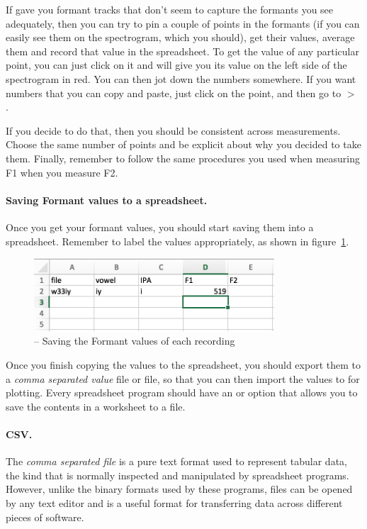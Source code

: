 If \Praat{} gave you formant tracks that don't seem to capture the formants you see adequately, then you can try to pin a couple of points in the formants (if you can easily see them on the spectrogram, which you should), get their values, average them and record that value in the spreadsheet. To get the value of any particular point, you can just click on it and \Praat{} will give you its value on the left side of the spectrogram in red. You can then jot down the numbers somewhere. If you want numbers that you can copy and paste, just click on the point, and then go to  $>$ .

If you decide to do that, then you should be consistent across measurements. Choose the same number of points and be explicit about why you decided to take them. Finally, remember to follow the same procedures you used when measuring F1 when you measure F2.

\paragraph{Saving Formant values to a spreadsheet.} Once you get your formant values, you should start saving them into a spreadsheet. Remember to label the values appropriately, as shown in figure~\ref{saving-f1-f2}.

\begin{figure}[!tbp]
\caption{\MSExcel{} -- Saving the Formant values of each recording}
\label{saving-f1-f2}
	\begin{center}
		\includegraphics[width=0.8\textwidth]{./figures/SavingF1F2-10-Spreadsheet}
	\end{center}
\end{figure}

Once you finish copying the values to the spreadsheet, you should export them to a \emph{comma separated value} file or  file, so that you can then import the values to \Praat{} for plotting. Every spreadsheet program should have an  or  option that allows you to save the contents in a worksheet to a  file.

\paragraph{CSV.} The \emph{comma separated file} is a pure text format used to represent tabular data, the kind that is normally inspected and manipulated by spreadsheet programs. However, unlike the binary formats used by these programs,  files can be opened by any text editor and is a useful format for transferring data across different pieces of software.

